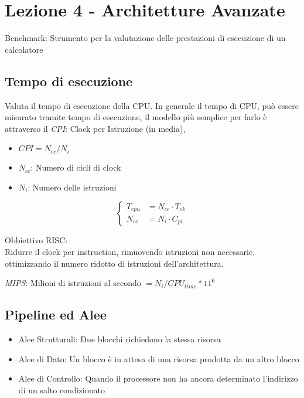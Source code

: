 \documentclass[a4paper,10pt]{article}
\begin{document}
\section{Lezione 4 - Architetture Avanzate}
Benchmark: Strumento per la valutazione delle prestazioni di esecuzione di un calcolatore

\subsection{Tempo di esecuzione}
Valuta il tempo di esecuzione della CPU.
In generale il tempo di CPU, può essere misurato tramite tempo di esecuzione, il modello più semplice per farlo è attraverso il
\textit{CPI}: Clock per Istruzione (in media),

\begin{itemize}
    \item $CPI = N_{cc}/N_i$
    \item $N_{cc}$: Numero di cicli di clock
    \item $N_i$: Numero delle istruzioni
\end{itemize}

\[
\begin{cases}
    T_{cpu} &= N_{cc} \cdot T_{ck}
    \\
    N_{cc} &= N_i \cdot C_{pi}
\end{cases}
\]


Obbiettivo RISC:
\\
Ridurre il clock per instruction, rimuovendo istruzioni non necessarie, ottimizzando il numero ridotto di istruzioni dell'architettura.

\textit{MIPS}: Milioni di istruzioni al secondo $ = N_i / CPU_{time} * 11^6$

\subsection{Pipeline ed Alee}
\begin{itemize}
    \item Alee Strutturali: Due blocchi richiedono la stessa risorsa
    \item Alee di Dato: Un blocco è in attesa di una risorsa prodotta da un altro blocco
    \item Alee di Controllo: Quando il processore non ha ancora determinato l'indirizzo di un salto condizionato
\end{itemize}
\end{document}
